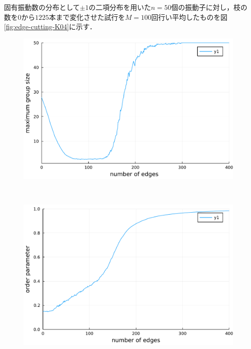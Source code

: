 \documentclass[../main]{subfiles}
\begin{document}
固有振動数の分布として$\pm 1$の二項分布を用いた$n=50$個の振動子に対し，枝の数を$0$から$1225$本まで変化させた試行を$M=100$回行い平均したものを図\ref{fig:edge-cutting-K04}に示す．
\begin{figure}[tbp]
    \begin{minipage}[b]{\linewidth}
      \centering
      \includegraphics[keepaspectratio, scale=0.5]{images/edge-finite-maxsize-delta00003400.pdf}
      \label{fig:edge-cutting-K04-maxsize}
    \end{minipage}\\
    \begin{minipage}[b]{\linewidth}
      \centering
      \includegraphics[keepaspectratio, scale=0.5]{images/edge-finite-R-delta00003400.pdf}
      \label{fig:edge-cutting-K04-R}

\end{minipage}
\end{figure}
\end{document}
